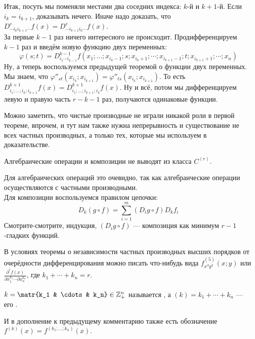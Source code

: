 \documentclass{article}
\begin{document}
\begin{itemize}
\begin{Proof}
            Итак, посуть мы поменяли местами два соседних индекса: $k$-й и $k+1$-й. Если $i_k=i_{k+1}$, доказывать нечего. Иначе надо доказать, что $D^{r}_{\cdots i_ki_{k+1}\cdots}f(x)=D^{r}_{\cdots i_{k+1}i_{k}\cdots}f(x)$.\\
            За первые $k-1$ раз ничего интересного не происходит. Продифференцируем $k-1$ раз и введём новую функцию двух переменных:
            $$
            \varphi(s;t)=D^{k-1}_{i_1\cdots i_{k-1}}f(x_1;\ldots;x_{i_k-1};s;x_{i_k+1};\cdots;x_{i_{k+1}-1};t;x_{i_{k+1}+1};\cdots;x_n)
            $$
            Ну, а теперь воспользуемся предыдущей теоремой о функции двух переменных. Мы знаем, что $\varphi''_{st}(x_{i_k};x_{i_{k+1}})=\varphi''_{ts}(x_{i_k};x_{i_{k+1}})$. То есть $D^{k+1}_{i_1;\ldots;i_k;i_{k+1}}f(x)=D^{k+1}_{i_1;\ldots;i_{k+1};i_k}f(x)$. Ну и всё, потом мы дифференцируем левую и правую часть $r-k-1$ раз, получаются одинаковые функции.
        \end{Proof}
        \begin{Comment}
            Можно заметить, что чистые производные не играли никакой роли в первой теореме, впрочем, и тут нам также нужна непрерывность и существование не всех частных производных, а только тех, которые мы используем в доказательстве.
        \end{Comment}
        \thm Алгебраические операции и композиции не выводят из класса $C^{(r)}$.
        \begin{Proof}
            Для алгебраических операций это очевидно, так как алгебраические операции осуществляются с частными производными.\\
            Для композиции воспользуемся правилом цепочки:
            $$
            D_k(g\circ f)=\sum\limits_{i=1}^m(D_ig\circ f)D_kf_i
            $$
            Смотрите-смотрите, индукция, $(D_ig\circ f)$ --- композиция как минимум $r-1$-гладких функций.
        \end{Proof}
        \begin{Comment}
            В условиях теоремы о независимости частных производных высших порядков от очерёдности дифференцирования можно писать что-нибудь вида $f^{(5)}_{x^3y^2}(x;y)$ или $\frac{\partial^rf(x)}{\partial x_1^{k_1}\cdots\partial x_n^{k_n}}$, где $k_1+\cdots+k_n=r$.
        \end{Comment}
        \dfn $k=\matr{k_1 & \cdots & k_n}\in\mathbb Z^n_+$ называется , а $(k)=k_1+\cdots+k_n$ --- его .
        \begin{Comment}
            И в дополнение к предыдущему комментарию также есть обозначение $f^{(k)}(x)=f^{(k_1;\ldots;k_n)}(x)$.

\end{Comment}
\end{itemize}
\end{document}

